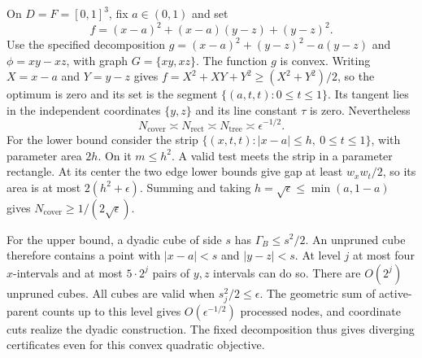 \begin{example}
\label{geom:ex-aligned-three}
On $D=F=[0,1]^3$, fix $a\in(0,1)$ and set
\[
 f=(x-a)^2+(x-a)(y-z)+(y-z)^2.
\]
Use the specified decomposition
$g=(x-a)^2+(y-z)^2-a(y-z)$ and $\phi=xy-xz$, with graph
$G=\{xy,xz\}$. The function $g$ is convex. Writing $X=x-a$ and
$Y=y-z$ gives
$f=X^2+XY+Y^2\geq(X^2+Y^2)/2$, so the optimum is zero and its
set is the segment $\{(a,t,t):0\leq t\leq1\}$.
Its tangent lies in the independent coordinates $\{y,z\}$ and its
line constant $\tau$ is zero. Nevertheless
\[
 N_{\mathrm{cover}}\asymp N_{\mathrm{rect}}
             \asymp N_{\mathrm{tree}}\asymp\epsilon^{-1/2}.
\]
For the lower bound consider the strip
$\{(x,t,t):|x-a|\leq h,\ 0\leq t\leq1\}$, with parameter area $2h$.
On it $m\leq h^2$. A valid test meets the strip in a parameter
rectangle. At its center the two edge lower bounds give gap at least
$w_xw_t/2$, so its area is at most $2(h^2+\epsilon)$.
Summing and taking $h=\sqrt\epsilon\leq\min(a,1-a)$ gives
$N_{\mathrm{cover}}\geq1/(2\sqrt\epsilon)$.

For the upper bound, a dyadic cube of side $s$ has
$\Gamma_B\leq s^2/2$. An unpruned cube therefore contains a point
with $|x-a|<s$ and $|y-z|<s$. At level $j$ at most four $x$-intervals
and at most $5\cdot2^j$ pairs of $y,z$ intervals can do so.
There are $O(2^j)$ unpruned cubes. All cubes are valid when
$s_j^2/2\leq\epsilon$. The geometric sum of active-parent counts
up to this level gives $O(\epsilon^{-1/2})$ processed nodes, and
coordinate cuts realize the dyadic construction. The fixed
decomposition thus gives diverging certificates even for this convex
quadratic objective.
\end{example}
